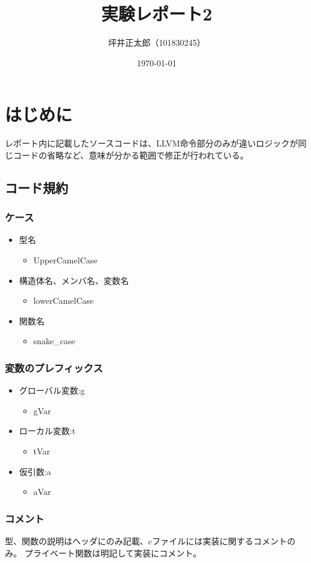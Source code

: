\documentclass[a4paper,12pt]{jsarticle}
\begin{document}
\title{実験レポート2}
\author{坪井正太郎（101830245）}
\date{\today}
\maketitle
\section{はじめに}
レポート内に記載したソースコードは、LLVM命令部分のみが違いロジックが同じコードの省略など、意味が分かる範囲で修正が行われている。

\subsection{コード規約}
\subsubsection*{ケース}
\begin{itemize}
  \item 型名
        \begin{itemize}
          \item UpperCamelCase
        \end{itemize}
  \item 構造体名、メンバ名、変数名
        \begin{itemize}
          \item lowerCamelCase
        \end{itemize}
  \item 関数名
        \begin{itemize}
          \item snake\_case
        \end{itemize}
\end{itemize}

\subsubsection*{変数のプレフィックス}
\begin{itemize}
  \item グローバル変数:g
        \begin{itemize}
          \item gVar
        \end{itemize}
  \item ローカル変数:t
        \begin{itemize}
          \item tVar
        \end{itemize}
  \item 仮引数:a
        \begin{itemize}
          \item aVar
        \end{itemize}
\end{itemize}

\subsubsection*{コメント}
型、関数の説明はヘッダにのみ記載、cファイルには実装に関するコメントのみ。
プライベート関数は明記して実装にコメント。




\end{document}
